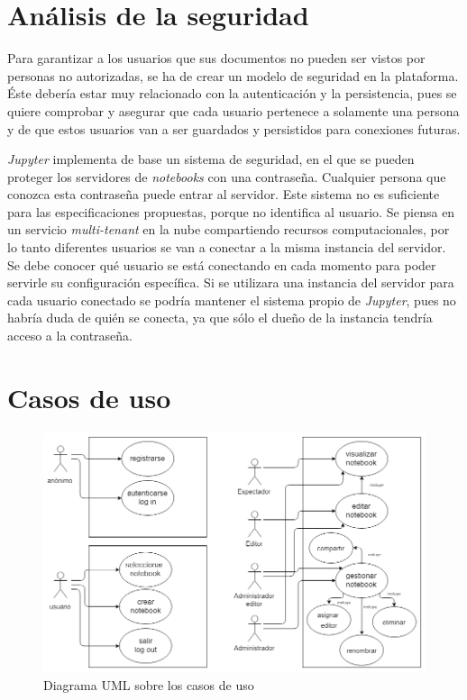 \documentclass[11pt,spanish,listoffigures]{tfgetsinf}
\begin{document}

\section{Análisis de la seguridad}
\label{sec:analisis-seguridad}

Para garantizar a los usuarios que sus documentos no pueden ser vistos por personas no autorizadas, se ha de crear un modelo de seguridad en la plataforma. Éste debería estar muy relacionado con la autenticación y la persistencia, pues se quiere comprobar y asegurar que cada usuario pertenece a solamente una persona y de que estos usuarios van a ser guardados y persistidos para conexiones futuras.

\textit{Jupyter} implementa de base un sistema de seguridad, en el que se pueden proteger los servidores de \textit{notebooks} con una contraseña. Cualquier persona que conozca esta contraseña puede entrar al servidor. Este sistema no es suficiente para las especificaciones propuestas, porque no identifica al usuario. Se piensa en un servicio \textit{multi-tenant} en la nube compartiendo recursos computacionales, por lo tanto diferentes usuarios se van a conectar a la misma instancia del servidor. Se debe conocer qué usuario se está conectando en cada momento para poder servirle su configuración específica. Si se utilizara una instancia del servidor para cada usuario conectado se podría mantener el sistema propio de \textit{Jupyter}, pues no habría duda de quién se conecta, ya que sólo el dueño de la instancia tendría acceso a la contraseña.



\section{Casos de uso}
\label{sec:casos-uso}

\begin{figure}[H]
	\centering
  	\includegraphics[width=\linewidth]{UML.png}
  	\caption{Diagrama UML sobre los casos de uso}
  	\label{fig:UML}
\end{figure}
\end{document}
